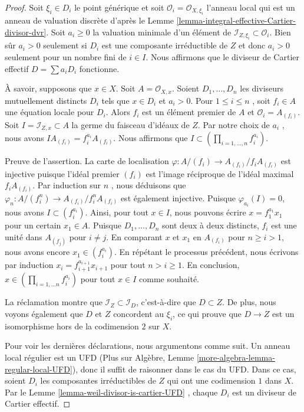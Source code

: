 \begin{proof}
Soit  $\xi_i \in D_i$  le point générique et soit  $\mathcal{O}_i = \mathcal{O}_{X, \xi_i}$  l'anneau local qui est
un anneau de valuation discrète d'après le Lemme  \ref{lemma-integral-effective-Cartier-divisor-dvr}. Soit  $a_i \geq 0$ 
la valuation minimale d'un élément de  $\mathcal{I}_{Z, \xi_i} \subset \mathcal{O}_i$. Bien sûr  $a_i > 0$ 
seulement si  $D_i$  est une composante irréductible de  $Z$  et donc
 $a_i > 0$  seulement pour un nombre fini de  $i \in I$. Nous affirmons que le
diviseur de Cartier effectif  $D = \sum a_i D_i$  fonctionne.

\medskip\noindent
À savoir, supposons que  $x \in X$. Soit  $A = \mathcal{O}_{X, x}$. Soient  $D_1, \ldots, D_n$  les
diviseurs mutuellement distincts  $D_i$  tels que  $x \in D_i$  et
 $a_i > 0$. Pour  $1 \leq i \leq n$ , soit  $f_i \in A$  une équation locale pour
 $D_i$. Alors  $f_i$  est un élément premier de  $A$  et
 $\mathcal{O}_i = A_{(f_i)}$. Soit  $I = \mathcal{I}_{Z, x} \subset A$  la germe du faisceau d'idéaux de  $Z$. Par
notre choix de  $a_i$ , nous avons  $I A_{(f_i)} = f_i^{a_i}A_{(f_i)}$. Nous affirmons que
 $I \subset (\prod_{i = 1, \ldots, n} f_i^{a_i})$.

\medskip\noindent
Preuve de l'assertion. La carte de localisation  $\varphi : A/(f_i) \to A_{(f_i)}/f_iA_{(f_i)}$  est injective puisque
l'idéal premier  $(f_i)$  est l'image réciproque de l'idéal maximal
 $f_iA_{(f_i)}$. Par induction sur  $n$ , nous déduisons que  $\varphi_n : A/(f_i^n)\to A_{(f_i)}/f_i^nA_{(f_i)}$  est
également injective. Puisque  $\varphi_{a_i}(I) = 0$, nous avons  $I \subset (f_i^{a_i})$. Ainsi, pour
tout  $x \in I$, nous pouvons écrire  $x = f_1^{a_1}x_1$  pour un certain  $x_1 \in A$.
Puisque  $D_1, \ldots, D_n$  sont deux à deux distincts,  $f_i$  est une unité dans
 $A_{(f_j)}$  pour  $i \not = j$. En comparant  $x$  et  $x_1$  en
 $A_{(f_i)}$  pour  $n \geq i > 1$, nous avons encore  $x_1 \in (f_i^{a_i})$. En répétant le
processus précédent, nous écrivons par induction  $x_i = f_{i + 1}^{a_{i + 1}}x_{i + 1}$  pour tout
 $n > i \geq 1$. En conclusion,  $x \in (\prod_{i = 1, \ldots n} f_i^{a_i})$  pour tout  $x \in I$  comme souhaité.

\medskip\noindent
La réclamation montre que  $\mathcal{I}_Z \subset \mathcal{I}_D$, c'est-à-dire que  $D \subset Z$. De plus,
nous voyons également que  $D$  et  $Z$  concordent au  $\xi_i$,
ce qui prouve que  $D \to Z$  est un isomorphisme hors de la codimension
 $2$  sur  $X$.

\medskip\noindent
Pour voir les dernières déclarations, nous argumentons comme suit. Un anneau local
régulier est un UFD (Plus sur Algèbre, Lemme  \ref{more-algebra-lemma-regular-local-UFD}), donc il suffit de
raisonner dans le cas du UFD. Dans ce cas, soient  $D_i$  les composantes
irréductibles de  $Z$  qui ont une codimension  $1$  dans
 $X$. Par le Lemme  \ref{lemma-weil-divisor-is-cartier-UFD} , chaque  $D_i$  est un diviseur de
Cartier effectif.
\end{proof}

